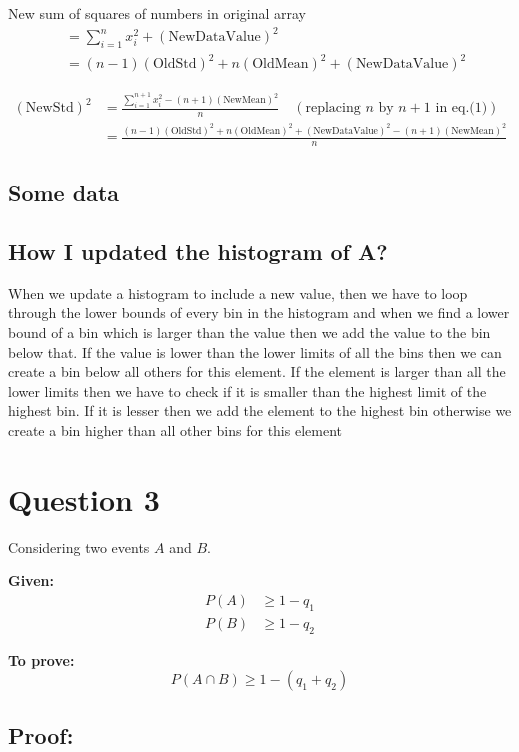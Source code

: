 \documentclass[12pt]{article}
\begin{document}
New sum of squares of numbers in original array
\begin{align*}
& = \sum_{i=1}^{n} x_i^2 + (\text{NewDataValue})^2 \\
& = (n-1)(\text{OldStd})^2 + n(\text{OldMean})^2 + (\text{NewDataValue})^2
\end{align*}

\begin{align*}
(\text{NewStd})^2 & = \frac{\sum_{i=1}^{n+1} x_i^2 - (n+1)(\text{NewMean})^2}{n} \quad (\text{replacing $n$ by $n+1$ in eq.(1)}) \\
& = \frac{(n-1)(\text{OldStd})^2 + n(\text{OldMean})^2 + (\text{NewDataValue})^2 - (n+1)(\text{NewMean})^2}{n}
\end{align*}

\subsection{Some data}


\subsection{How I updated the histogram of A?}
When we update a histogram to include a new value, then we have to loop through the lower bounds of every bin in the histogram and when we find a lower bound of a bin which is larger than the value then we add the value to the bin below that. If the value is lower than the lower limits of all the bins then we can create a bin below all others for this element. If the element  is larger than all the lower limits then we have to check if it is smaller than the highest limit of the highest bin. If it is lesser then we add the element to the highest bin otherwise we create a bin higher than all other bins for this element
\section{Question 3}

Considering two events $A$ and $B$.

\noindent
\textbf{Given:}
\begin{align}
    P(A) &\ge 1 - q_1 \tag{1} \\[2mm]
    P(B) &\ge 1 - q_2 \tag{2}
\end{align}

\noindent
\textbf{To prove:}
\[
    P(A \cap B) \ge 1 - (q_1 + q_2)
\]

\subsection*{Proof:}
\end{document}
